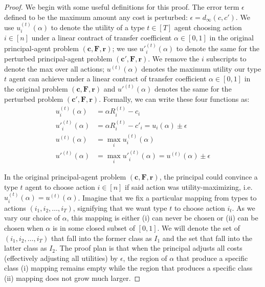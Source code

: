 \documentclass{article}
\newcommand{\dist}[3]{d_{#3}\left(#1, #2\right)}
\newcommand{\costvector}{\bm{c}}
\newcommand{\CostVector}{\bm{c}}
\newcommand{\ForecastTensor}{\bm{F}}
\newcommand{\rewardvector}{\bm{r}}
\newcommand{\RewardVector}{\bm{r}}
\newcommand{\PrincipalAgentProblem}{\left(\costvector, \ForecastTensor, \rewardvector\right)}
\newcommand{\TransferCoefficient}{\alpha}
\newcommand{\actionmapping}{(i_1, i_2, \ldots, i_T)}
\begin{document}
\begin{proof}
  We begin with some useful definitions for this proof. The error term $\epsilon$ defined to be the maximum amount any cost is perturbed: $\epsilon = \dist{c}{c'}{\infty}$. We use $u^{(t)}_i(\TransferCoefficient)$ to denote the utility of a type $t \in [T]$ agent choosing action $i \in [n]$ under a linear contract of transfer coefficient $\TransferCoefficient \in [0, 1]$ in the original principal-agent problem $\PrincipalAgentProblem$; we use $u'^{(t)}_i(\TransferCoefficient)$ to denote the same for the perturbed principal-agent problem $(\CostVector', \ForecastTensor, \RewardVector)$. We remove the $i$ subscripts to denote the max over all actions; $u^{(t)}(\TransferCoefficient)$ denotes the maximum utility our type $t$ agent can achieve under a linear contract of transfer coefficient $\TransferCoefficient \in [0, 1]$ in the original problem $\PrincipalAgentProblem$ and $u'^{(t)}(\TransferCoefficient)$ denotes the same for the perturbed problem $(\CostVector', \ForecastTensor, \RewardVector)$. Formally, we can write these four functions as:
  \begin{align*}
    u^{(t)}_i(\TransferCoefficient) &= \TransferCoefficient R^{(t)}_i - c_i \\
    u'^{(t)}_i(\TransferCoefficient) &= \TransferCoefficient R^{(t)}_i - c'_i = u_i(\TransferCoefficient) \pm \epsilon \\
    u^{(t)}(\TransferCoefficient) &= \max_i u^{(t)}_i(\TransferCoefficient) \\
    u'^{(t)}(\TransferCoefficient) &= \max_i u'^{(t)}_i (\TransferCoefficient) = u^{(t)}(\TransferCoefficient) \pm \epsilon
  \end{align*}
  
  In the original principal-agent problem $\PrincipalAgentProblem$, the principal could convince a type $t$ agent to choose action $i \in [n]$ if said action was utility-maximizing, i.e. $u^{(t)}_i(\TransferCoefficient) = u^{(t)}(\TransferCoefficient)$. Imagine that we fix a particular mapping from types to actions $\actionmapping$, signifying that we want type $t$ to choose action $i_t$. As we vary our choice of $\TransferCoefficient$, this mapping is either (i) can never be chosen or (ii) can be chosen when $\TransferCoefficient$ is in some closed subset of $[0, 1]$. We will denote the set of $\actionmapping$ that fall into the former class as $I_1$ and the set that fall into the latter class as $I_2$. The proof plan is that when the principal adjusts all costs (effectively adjusting all utilities) by $\epsilon$, the region of $\TransferCoefficient$ that produce a specific class (i) mapping remains empty while the region that produces a specific class (ii) mapping does not grow much larger.
  

\end{proof}
\end{document}
